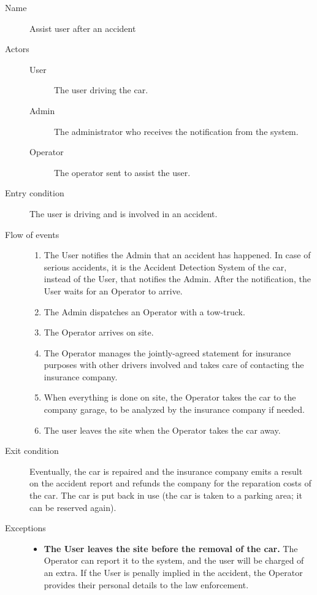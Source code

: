 		\begin{description}
			\item[Name] Assist user after an accident
			\item[Actors] \hfill
			\begin{description}
				\item[User] The user driving the car.
				\item[Admin] The administrator who receives the notification from the system.
				\item[Operator] The operator sent to assist the user.
			\end{description}
			\item[Entry condition] The user is driving and is involved in an accident.
			\item[Flow of events] \hfill
			\begin{enumerate}
				\item The User notifies the Admin that an accident has happened. In case of serious accidents, it is the Accident Detection System of the car, instead of the User, that notifies the Admin. After the notification, the User waits for an Operator to arrive.
				\item The Admin dispatches an Operator with a tow-truck.
				\item The Operator arrives on site.
				\item The Operator manages the jointly-agreed statement for insurance purposes with other drivers involved and takes care of contacting the insurance company.
				\item When everything is done on site, the Operator takes the car to the company garage, to be analyzed by the insurance company if needed.
				\item The user leaves the site when the Operator takes the car away.
			\end{enumerate}
			\item[Exit condition] Eventually, the car is repaired and the insurance company emits a result on the accident report and refunds the company for the reparation costs of the car. The car is put back in use (the car is taken to a parking area; it can be reserved again).
			\item[Exceptions] \hfill
			\begin{itemize}
				\item \textbf{The User leaves the site before the removal of the car.} The Operator can report it to the system, and the user will be charged of an extra. If the User is penally implied in the accident, the Operator provides their personal details to the law enforcement.

\end{itemize}
\end{description}
